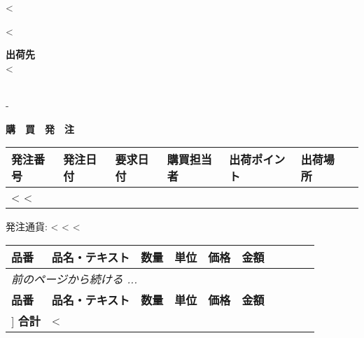 <%

\begin{CJK}{UTF8}{arialuni}

\vspace*{-3.3cm}
<%
\vspace*{0.5cm}

\parbox[t]{.50\textwidth}{
\hspace{10cm}
}
\parbox[t]{.40\textwidth}{
\textbf{出荷先} \\
<%
}

\hfill \\

\vspace{0.5cm}
-
\vspace{0.2cm}

\centerline{\large\bf{購　買　発　注}}
\normalsize
\hfill

\vspace{1cm}

\begin{tabularx}{\textwidth}{*{7}{|X}|} \hline
  \textbf{発注番号} & \textbf{発注日付} & \textbf{要求日付} & \textbf{購買担当者}
  & \textbf{出荷ポイント} & \textbf{出荷場所} \\ [0.5em]
  \hline
  <%
  <%
  \hline
\end{tabularx}

\vspace{0.5cm}
	発注通貨: <%
<%
<%
\vspace{0.5cm}

\begin{longtable}{|lp{5.5cm} @{\extracolsep\fill} rrrl|} \hline
  \textbf{品番} & \textbf{品名・テキスト} & \textbf{数量} & 
  \textbf{単位} & \textbf{価格} & \textbf{金額}\\
  \hline
\endfirsthead
  \multicolumn{5}{l}{\emph{前のページから続ける ...}} \\
  \hline
  \textbf{品番} & \textbf{品名・テキスト} & \textbf{数量} & 
  \textbf{単位} & \textbf{価格} & \textbf{金額}\\ ]     
  \hline
\endhead
   \hline \multicolumn{5}{r}{\emph{次おページ御覧下さい ...}}
\endfoot
   \hline
   \multicolumn{5}{|r} \textbf{合計} & <%


\end{longtable}
\end{CJK}
